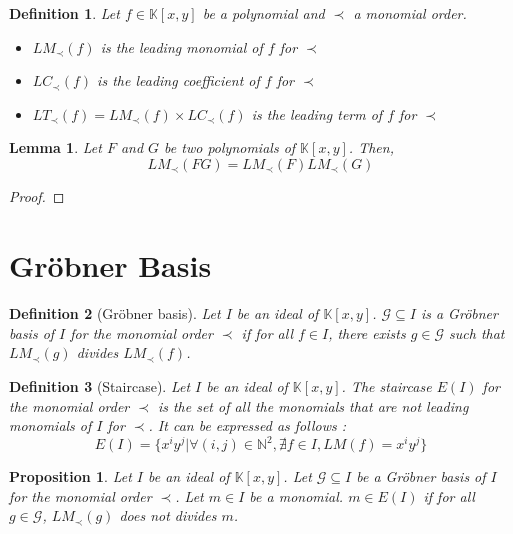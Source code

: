\documentclass{article}
\newtheorem{lemma}[theorem]{Lemma}
\newtheorem{definition}{Definition}[section]
\newtheorem{proposition}{Proposition}[section]
\begin{document}
\begin{definition}
    Let $f \in \mathbb{K}[x, y]$ be a polynomial and $\prec$ a monomial order. 
    \begin{itemize}
        \item $LM_{\prec}(f)$ is the leading monomial of $f$ for $\prec$
        \item $LC_{\prec}(f)$ is the leading coefficient of $f$ for $\prec$
        \item $LT_{\prec}(f) = LM_{\prec}(f) \times LC_{\prec}(f)$ is the leading term of $f$ for $\prec$
    \end{itemize}
\end{definition}

\begin{lemma}
    Let $F$ and $G$ be two polynomials of $\mathbb{K}[x, y]$. Then, 
    \begin{displaymath}
        LM_{\prec}(FG) = LM_{\prec}(F)LM_{\prec}(G)
    \end{displaymath}
\end{lemma}

\begin{proof}
    
\end{proof}

\section{Gröbner Basis}

\begin{definition}[Gröbner basis]
    Let $I$ be an ideal of $\mathbb{K}[x, y]$. $\mathscr{G} \subseteq I$ is a Gröbner basis of $I$ for the monomial order $\prec$ if for all $f \in I$, there exists $g \in \mathscr{G}$ such that $LM_{\prec}(g)$ divides $LM_{\prec}(f)$. 
\end{definition}

\begin{definition}[Staircase]
    Let $I$ be an ideal of $\mathbb{K}[x, y]$. The staircase $E(I)$ for the monomial order $\prec$ is the set of all the monomials that are not leading monomials of $I$ for $\prec$. It can be expressed as follows : 
    \begin{displaymath}
        E(I) = \{ x^{i}y^{j} | \forall (i, j) \in \mathbb{N}^{2}, \nexists f \in I, LM(f) = x^{i}y^{j}\}
    \end{displaymath}
\end{definition}

\begin{proposition}
    Let $I$ be an ideal of $\mathbb{K}[x, y]$. Let $\mathscr{G} \subseteq I$ be a Gröbner basis of $I$ for the monomial order $\prec$. Let $m \in I$ be a monomial. $m \in E(I)$ if for all $g \in \mathscr{G}$, $LM_{\prec}(g)$ does not divides $m$.
\end{proposition}
\end{document}
